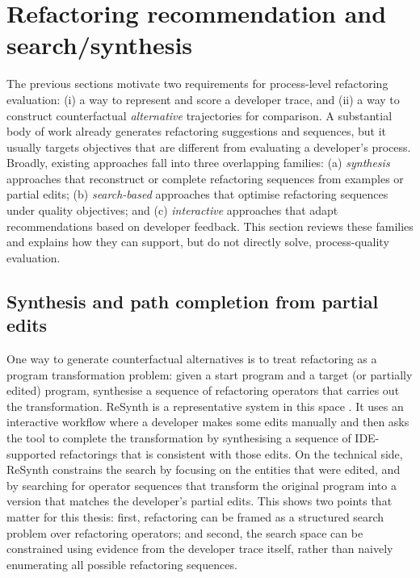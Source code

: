 
\section{Refactoring recommendation and search/synthesis}
\label{sec:recommendation-synthesis}

The previous sections motivate two requirements for process-level refactoring evaluation: (i) a way to represent and score a developer trace, and (ii) a way to construct counterfactual \emph{alternative} trajectories for comparison. A substantial body of work already generates refactoring suggestions and sequences, but it usually targets objectives that are different from evaluating a developer's process. Broadly, existing approaches fall into three overlapping families: (a) \emph{synthesis} approaches that reconstruct or complete refactoring sequences from examples or partial edits; (b) \emph{search-based} approaches that optimise refactoring sequences under quality objectives; and (c) \emph{interactive} approaches that adapt recommendations based on developer feedback. This section reviews these families and explains how they can support, but do not directly solve, process-quality evaluation.

\subsection{Synthesis and path completion from partial edits}
One way to generate counterfactual alternatives is to treat refactoring as a program transformation problem: given a start program and a target (or partially edited) program, synthesise a sequence of refactoring operators that carries out the transformation. ReSynth is a representative system in this space \cite{raychev2013resynth}. It uses an interactive workflow where a developer makes some edits manually and then asks the tool to complete the transformation by synthesising a sequence of IDE-supported refactorings that is consistent with those edits. On the technical side, ReSynth constrains the search by focusing on the entities that were edited, and by searching for operator sequences that transform the original program into a version that matches the developer's partial edits. This shows two points that matter for this thesis: first, refactoring can be framed as a structured search problem over refactoring operators; and second, the search space can be constrained using evidence from the developer trace itself, rather than naively enumerating all possible refactoring sequences.

